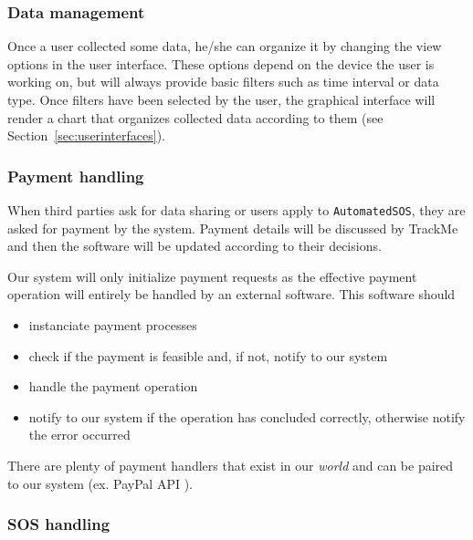     \subsubsection{Data management}

      Once a user collected some data, he/she can organize it by changing the view options in the user interface. These options depend on the device the user is working on, but will always provide basic filters such as time interval or data type. Once filters have been selected by the user, the graphical interface will render a chart that organizes collected data according to them (see Section~\ref{sec:userinterfaces}).

    \subsubsection{Payment handling}
    \label{sec:payment}


      When third parties ask for data sharing or users apply to \texttt{AutomatedSOS}, they are asked for payment by the system. Payment details will be discussed by TrackMe and then the software will be updated according to their decisions.

      Our system will only initialize payment requests as the effective payment operation will entirely be handled by an external software. This software should
      \begin{itemize}
        \item instanciate payment processes
        \item check if the payment is feasible and, if not, notify to our system
        \item handle the payment operation
        \item notify to our system if the operation has concluded correctly, otherwise notify the error occurred
      \end{itemize}
      There are plenty of payment handlers that exist in our \textit{world} and can be paired to our system (ex. PayPal API \cite{paypal}).

    \subsubsection{SOS handling}
    \label{sec:sossystem}

